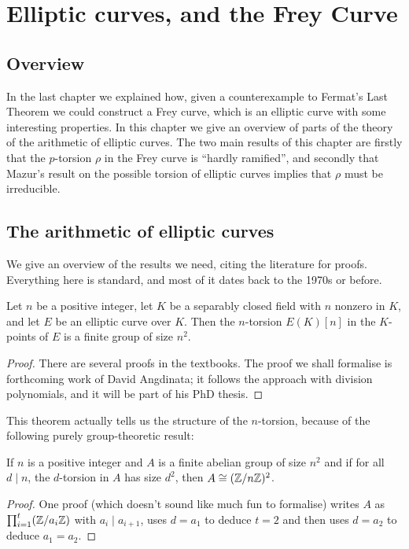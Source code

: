 \chapter{Elliptic curves, and the Frey Curve}

\section{Overview}

In the last chapter we explained how, given a counterexample to Fermat's Last Theorem we could construct a Frey curve, which is an elliptic curve with some interesting properties. In this chapter we give an overview of parts of the theory of the arithmetic of elliptic curves. The two main results of this chapter are firstly that the $p$-torsion $\rho$ in the Frey curve is ``hardly ramified'', and secondly that Mazur's result on the possible torsion of elliptic curves implies that $\rho$ must be irreducible. 

\section{The arithmetic of elliptic curves}

We give an overview of the results we need, citing the literature for proofs. Everything here is standard, and most
of it dates back to the 1970s or before.

\begin{theorem}\label{Elliptic_curve_p_torsion_size}\tangled{}
  Let $n$ be a positive integer, let $K$ be a separably closed
  field with $n$ nonzero in $K$, and let $E$ be an elliptic curve over $K$. Then the $n$-torsion $E(K)[n]$ 
  in the $K$-points of $E$ is a finite group of size $n^2$.
\end{theorem}
\begin{proof}
  There are several proofs in the textbooks. The proof we shall formalise is forthcoming work of David Angdinata; it follows the approach with division polynomials, and it will be part of his PhD thesis.
\end{proof}

This theorem actually tells us the structure of the $n$-torsion, because of the following
purely group-theoretic result:
\begin{lemma}\label{group_theory_lemma}
  If $n$ is a positive integer and $A$ is a finite
  abelian group of size $n^2$ and if for all $d\mid n$, the $d$-torsion in $A$ has size $d^2$, 
  then $A\cong (\mathbb{Z}/n\mathbb{Z})^2$. 
\end{lemma}
\begin{proof}
  One proof (which doesn't sound like much fun to formalise) writes $A$ as $\prod_{i=1}^t(\mathbb{Z}/a_i\mathbb{Z})$
  with $a_i\mid a_{i+1}$, uses $d=a_1$ to deduce $t=2$ and then uses $d=a_2$ to deduce $a_1=a_2$.
\end{proof}

